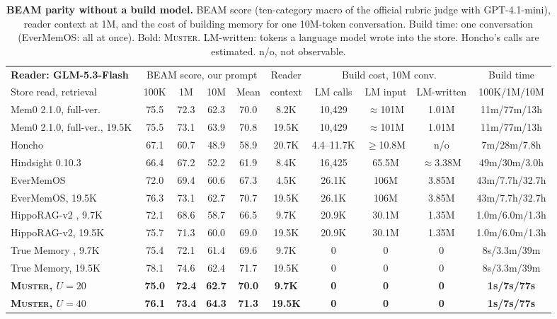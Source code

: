 \documentclass{article}
\newcommand{\ours}{\rowcolor{oursbg}}
\newcommand{\tabfont}{\fontsize{7.5}{8.5}\selectfont\renewcommand{\arraystretch}{1.0}}
\newcommand{\sys}{\textsc{Muster}}
\begin{document}
\begin{table}[t]
\centering\tabfont
\caption{\textbf{BEAM parity without a build model.} BEAM \cite{beam} score (ten-category macro of the official rubric judge with GPT-4.1-mini), reader context at 1M, and the cost of building memory for one 10M-token conversation. Build time: one conversation (EverMemOS: all at once). Bold: \sys{}. LM-written: tokens a language model wrote into the store. Honcho's calls are estimated. n/o, not observable.}
\label{tab:beamscale}
\setlength{\tabcolsep}{3.7pt}
\begin{tabular}{lccccccccc}
\toprule
\textbf{Reader: GLM-5.3-Flash}~\cite{glm5} & \multicolumn{4}{c}{BEAM score, our prompt} & Reader & \multicolumn{3}{c}{Build cost, 10M conv.} & Build time \\
\cmidrule(lr){2-5}\cmidrule(lr){7-9}
Store read, retrieval & 100K & 1M & 10M & Mean & context & LM calls & LM input & LM-written & 100K/1M/10M \\
\midrule
Mem0 2.1.0, full-ver.\ \cite{mem0oss} & 75.5 & 72.3 & 62.3 & 70.0 & 8.2K & 10{,}429 & $\approx$101M & 1.01M & 11m/77m/13h \\
Mem0 2.1.0, full-ver., 19.5K & 75.5 & 73.1 & 63.9 & 70.8 & 19.5K & 10{,}429 & $\approx$101M & 1.01M & 11m/77m/13h \\
Honcho \cite{honcho} & 67.1 & 60.7 & 48.9 & 58.9 & 20.7K & 4.4--11.7K & $\ge$10.8M & n/o & 7m/28m/7.8h \\
Hindsight 0.10.3 \cite{hindsight} & 66.4 & 67.2 & 52.2 & 61.9 & 8.4K & 16{,}425 & 65.5M & $\approx$3.38M & 49m/30m/3.0h \\
EverMemOS \cite{evermemos} & 72.0 & 69.4 & 60.6 & 67.3 & 4.5K & 26.1K & 106M & 3.85M & 43m/7.7h/32.7h \\
EverMemOS, 19.5K & 76.3 & 73.1 & 62.7 & 70.7 & 19.5K & 26.1K & 106M & 3.85M & 43m/7.7h/32.7h \\
\addlinespace[2pt]
HippoRAG-v2 \cite{hipporag2}, 9.7K & 72.1 & 68.6 & 58.7 & 66.5 & 9.7K & 20.9K & 30.1M & 1.35M & 1.0m/6.0m/1.3h \\
HippoRAG-v2, 19.5K & 75.7 & 71.3 & 60.0 & 69.0 & 19.5K & 20.9K & 30.1M & 1.35M & 1.0m/6.0m/1.3h \\
\midrule
True Memory \cite{truememory}, 9.7K & 75.4 & 72.1 & 61.4 & 69.6 & 9.7K & 0 & 0 & 0 & 8s/3.3m/39m \\
True Memory, 19.5K & 78.1 & 74.6 & 62.4 & 71.7 & 19.5K & 0 & 0 & 0 & 8s/3.3m/39m \\
\addlinespace[2pt]
\ours \textbf{\sys{}, $U{=}20$} & \textbf{75.0} & \textbf{72.4} & \textbf{62.7} & \textbf{70.0} & \textbf{9.7K} & \textbf{0} & \textbf{0} & \textbf{0} & \textbf{1s/7s/77s} \\
\ours \textbf{\sys{}, $U{=}40$} & \textbf{76.1} & \textbf{73.4} & \textbf{64.3} & \textbf{71.3} & \textbf{19.5K} & \textbf{0} & \textbf{0} & \textbf{0} & \textbf{1s/7s/77s} \\
\bottomrule
\end{tabular}
\end{table}
\end{document}
